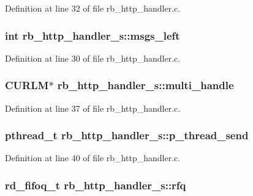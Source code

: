 Definition at line 32 of file rb\-\_\-http\-\_\-handler.\-c.

\hypertarget{structrb__http__handler__s_a803db851c00a617f8a80f00f29d9dba3}{
\subsubsection[{msgs\-\_\-left}]{\setlength{\rightskip}{0pt plus 5cm}int rb\-\_\-http\-\_\-handler\-\_\-s\-::msgs\-\_\-left}}\label{structrb__http__handler__s_a803db851c00a617f8a80f00f29d9dba3}


Definition at line 30 of file rb\-\_\-http\-\_\-handler.\-c.

\hypertarget{structrb__http__handler__s_a45c0ce1f2e4d154d0194bb60569c0faf}{
\subsubsection[{multi\-\_\-handle}]{\setlength{\rightskip}{0pt plus 5cm}C\-U\-R\-L\-M$\ast$ rb\-\_\-http\-\_\-handler\-\_\-s\-::multi\-\_\-handle}}\label{structrb__http__handler__s_a45c0ce1f2e4d154d0194bb60569c0faf}


Definition at line 37 of file rb\-\_\-http\-\_\-handler.\-c.

\hypertarget{structrb__http__handler__s_ae969c34a0421fe32951cb31802735f13}{
\subsubsection[{p\-\_\-thread\-\_\-send}]{\setlength{\rightskip}{0pt plus 5cm}pthread\-\_\-t rb\-\_\-http\-\_\-handler\-\_\-s\-::p\-\_\-thread\-\_\-send}}\label{structrb__http__handler__s_ae969c34a0421fe32951cb31802735f13}


Definition at line 40 of file rb\-\_\-http\-\_\-handler.\-c.

\hypertarget{structrb__http__handler__s_a39160211aefb64ec052138229da98632}{
\subsubsection[{rfq}]{\setlength{\rightskip}{0pt plus 5cm}rd\-\_\-fifoq\-\_\-t rb\-\_\-http\-\_\-handler\-\_\-s\-::rfq}}\label{structrb__http__handler__s_a39160211aefb64ec052138229da98632}


